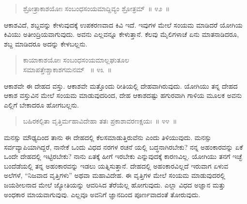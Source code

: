 \begin{verse}
ಶ್ರೋತ್ರಾಕಾಶಯೋಃ ಸಂಬಂಧಸಂಯಮಾದ್ದಿವ್ಯಂ ಶ್ರೋತ್ರಮ್​~॥ ೪೨~॥
\end{verse}

\vspace{-0.4cm}


\vspace{0.1cm}

ಆಕಾಶವಿದೆ, ಶಬ್ದವನ್ನು ಕೇಳುವುದಕ್ಕೆ ಉಪಕರಣವಾದ ಕಿವಿ ಇದೆ. ಇವುಗಳ ಮೇಲೆ ಸಂಯಮ ಮಾಡಿದರೆ ಯೋಗಿಯ ಕಿವಿಯು ಅತೀಂದ್ರಿಯವಾಗುವುದು. ಅವನು ಎಲ್ಲವನ್ನೂ ಕೇಳುತ್ತಾನೆ. ಕೆಲವು ಮೈಲಿಗಳಾಚೆ ಏನು ಮಾತನಾಡಿದರೂ, ಶಬ್ದ ಮಾಡಿದರೂ ಅದನ್ನು ಕೇಳಬಲ್ಲನು. 

\vspace{-0.3cm}

\begin{verse}
ಕಾಯಾಕಾಶಯೋಃ ಸಂಬಂಧಸಂಯಮಾಲ್ಲಘುತೂಲ\\ ಸಮಾಪತ್ತೇಶ್ಚಾಕಾಶಗಮನಮ್​~ \hfill{॥ ೪೩~॥}
\end{verse}

\vspace{-0.4cm}


\vspace{0.1cm}

ಆಕಾಶವೇ ಈ ದೇಹದ ವಸ್ತು. ಆಕಾಶವೇ ಮತ್ತೊಂದು ರೀತಿಯಲ್ಲಿ ದೇಹವಾಗಿರುವುದು. ಯೋಗಿಯು ತನ್ನ ದೇಹದ ಆಕಾಶ ವಸ್ತುವಿನ ಮೇಲೆ ಸಂಯಮ ಮಾಡುವುದರಿಂದ, ದೇಹ ಆಕಾಶದಷ್ಟು ಹಗುರವಾಗಿ ಗಾಳಿಯ ಮೂಲಕ ಅವನು ಎಲ್ಲಿಗೆ ಬೇಕಾದರೂ ಹೋಗಬಲ್ಲನು. 

\vspace{-0.3cm}

\begin{verse}
ಬಹಿರಕಲ್ಪಿತಾ ವೃತ್ತಿರ್ಮಹಾವಿದೇಹಾ ತತಃ ಪ್ರಕಾಶಾವರಣಕ್ಷಯಃ~॥ ೪೪~॥
\end{verse}

\vspace{-0.4cm}


\vspace{0.1cm}

ಮನಸ್ಸು ಮೌಢ್ಯದಿಂದ ತಾನು ಈ ದೇಹದಲ್ಲಿ ಕೆಲಸಮಾಡುತ್ತಿರುವೆನು ಎಂದು ತಿಳಿಯುವುದು. ಮನಸ್ಸು ಸರ್ವವ್ಯಾಪಿಯಾಗಿದ್ದರೆ, ನಾನೇಕೆ ಒಂದು ವಿಧದ ನರಗಳ ರಚನೆ ಯಲ್ಲಿ ಬದ್ಧನಾಗಿರಬೇಕು? ನನ್ನ ಅಹಂಕಾರವನ್ನು ಏಕೆ ಒಂದೇ ದೇಹದಲ್ಲಿ ಇಟ್ಟಿರಬೇಕು? ನಾನು ಏತಕ್ಕೆ ಹೀಗೆ ಇರಬೇಕು ಎನ್ನುವುದಕ್ಕೆ ಕಾರಣವಿಲ್ಲ. ಯೋಗಿಯು ತನಗೆ ಇಚ್ಛೆ ಬಂದೆಡೆಯಲ್ಲಿ ತನ್ನ ಅಹಂಕಾರವನ್ನು ಇಡಲು ಯತ್ನಿಸುತ್ತಾನೆ. ದೇಹದಲ್ಲಿ ಅಹಂಕಾರವಿಲ್ಲದೆ ಇರುವಾಗ ಏಳುವ ಅಲೆಗಳೆ, “ನಿಜವಾದ ವೃತ್ತಿಗಳು” ಅಥವಾ ಮಹಾವಿದೇಹ. ಈ ವೃತ್ತಿಗಳ ಮೇಲೆ ಸಂಯಮ ಮಾಡುವುದರಲ್ಲಿ ಜಯಶೀಲನಾದ ಮೇಲೆ ಜ್ಯೋತಿಯನ್ನು ಆವರಿಸಿದ ತೆರೆಯೆಲ್ಲ ಹೋಗುವುದು. ಎಲ್ಲಾ ವಿಧದ ಅಜ್ಞಾನ ಮತ್ತು ಅಂಧಕಾರ ಮಾಯವಾಗುವುವು. ಎಲ್ಲವೂ ಅವನಿಗೆ ಜ್ಞಾನದಿಂದ ಪೂರ್ಣವಾದಂತೆ ತೋರುವುದು. 

